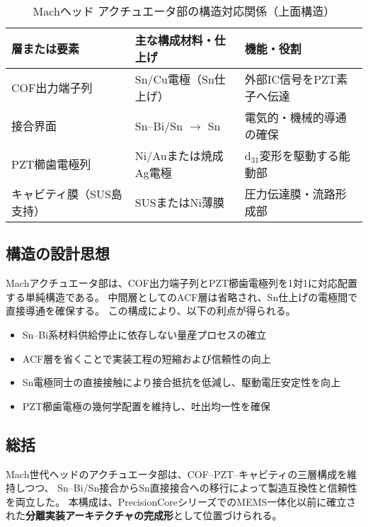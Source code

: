 \documentclass[conference]{IEEEtran}
\begin{document}
\begin{table}[t]
\centering
\caption{Machヘッド アクチュエータ部の構造対応関係（上面構造）}
\footnotesize
\begin{tabularx}{\columnwidth}{l l X}
\hline
層または要素 & 主な構成材料・仕上げ & 機能・役割 \\
\hline
COF出力端子列 & Sn/Cu電極（Sn仕上げ） & 外部IC信号をPZT素子へ伝達 \\
接合界面 & Sn–Bi/Sn $\rightarrow$ Sn & 電気的・機械的導通の確保 \\
PZT櫛歯電極列 & Ni/Auまたは焼成Ag電極 & d$_{31}$変形を駆動する能動部 \\
キャビティ膜（SUS島支持） & SUSまたはNi薄膜 & 圧力伝達膜・流路形成部 \\
\hline
\end{tabularx}
\label{tab:mach_actuator_layers}
\end{table}

\subsection{構造の設計思想}

Machアクチュエータ部は、COF出力端子列とPZT櫛歯電極列を1対1に対応配置する単純構造である。  
中間層としてのACF層は省略され、Sn仕上げの電極間で直接導通を確保する。  
この構成により、以下の利点が得られる。

\begin{itemize}
  \item Sn–Bi系材料供給停止に依存しない量産プロセスの確立  
  \item ACF層を省くことで実装工程の短縮および信頼性の向上  
  \item Sn電極同士の直接接触により接合抵抗を低減し、駆動電圧安定性を向上  
  \item PZT櫛歯電極の幾何学配置を維持し、吐出均一性を確保  
\end{itemize}

\subsection{総括}

Mach世代ヘッドのアクチュエータ部は、COF–PZT–キャビティの三層構成を維持しつつ、  
Sn–Bi/Sn接合からSn直接接合への移行によって製造互換性と信頼性を両立した。  
本構成は、PrecisionCoreシリーズでのMEMS一体化以前に確立された\textbf{分離実装アーキテクチャの完成形}として位置づけられる。
\end{document}
